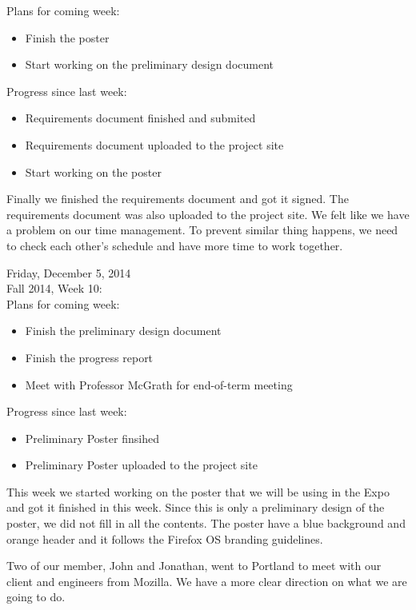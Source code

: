 Plans for coming week:
\begin{itemize}
\item Finish the poster​
\item Start working on the preliminary design document​
\end{itemize}

Progress since last week:​
\begin{itemize}
\item Requirements document​ finished and submited
\item Requirements document​ uploaded to the project site​
\item Start working on the poster
\end{itemize}

​Finally we finished the requirements document​ and got it signed. The requirements document​ was also uploaded to the project site​. We felt like we have a problem on our time management. To prevent similar thing happens, we need to check each other’s schedule and have more time to work together.

Friday, December 5, 2014 \\
Fall 2014, Week 10:​​ \\

Plans for coming week:
\begin{itemize}
​\item Finish the preliminary design document​
​\item Finish the progress report
\item Meet with Professor McGrath for end-of-term meeting
\end{itemize}

Progress since last week:​
\begin{itemize}
\item ​Preliminary ​​​Poster​ finsihed​
\item ​Preliminary ​​​Poster​ ​uploaded to the project site​
​\end{itemize}

This week we started working on the ​​​poster that we will be using in the Expo and got it finished in this week​​. Since this is only a preliminary design of the poster, we did not fill in all the contents. The poster have ​a blue background and orange header and it​ follows the Firefox OS branding guidelines.

Two of our member, John and Jonathan, went to Portland to meet with our client and engineers from Mozilla. ​​​We have a more clear direction on what we are going to do.

